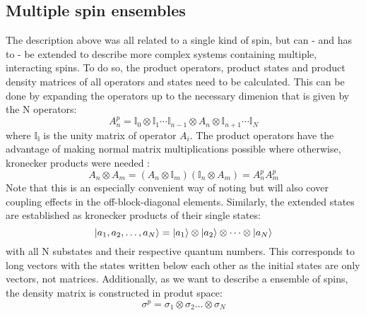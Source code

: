         \subsection{Multiple spin ensembles}
            The description above was all related to a single kind of spin, but can - and has to - be extended to describe more complex systems containing multiple, interacting spins. To do so, the product operators, product states and product density matrices of all operators and states need to be calculated. This can be done by expanding the operators up to the necessary dimenion that is given by the N operators:
            \begin{equation*}
                A^p_n = \mathbb{I}_0\otimes\mathbb{I}_1\cdots \mathbb{I}_{n-1} \otimes A_n \otimes \mathbb{I}_{n+1}\cdots \mathbb{I}_N
            \end{equation*}
            where $\mathbb{I_i}$ is the unity matrix of operator $A_i$. The product operators have the advantage of making normal matrix multiplications possible where otherwise, kronecker products were needed \cite{green_theory_2012-1}:
            \begin{equation}
                A_n\otimes A_m = (A_n \otimes \mathbb{I}_m)(\mathbb{I}_n \otimes A_m) = A^p_nA^p_m
            \end{equation}
            Note that this is an especially convenient way of noting but will also cover coupling effects in the off-block-diagonal elements. Similarly, the extended states are established as kronecker products of their single states:
            \begin{equation}
                \ket{a_1,a_2, \dots, a_N} = \ket{a_1}\otimes\ket{a_2}\otimes\dots\otimes\ket{a_N}
            \end{equation}
            with all N substates and their respective quantum numbers. This corresponds to long vectors with the states written below each other as the initial states are only vectors, not matrices.
            Additionally, as we want to describe a ensemble of spins, the density matrix is constructed in produt space:
            \begin{equation}
                \sigma^p = \sigma_1 \otimes\sigma_2\dots\otimes\sigma_N
            \end{equation}
